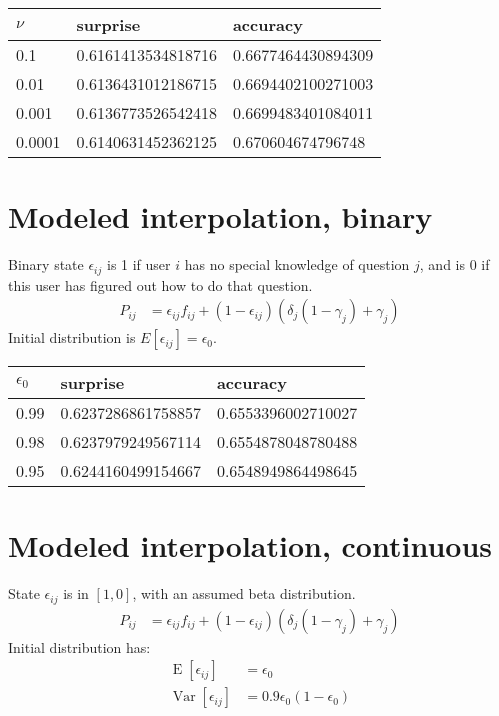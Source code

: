\documentclass{article}
\begin{document}
\begin{center}
  \begin{tabular}{lll}
    $\nu$ & surprise & accuracy \\
    \hline
    0.1 & 0.6161413534818716 & 0.6677464430894309 \\
    0.01 & 0.6136431012186715 & 0.6694402100271003 \\
    0.001 & 0.6136773526542418 & 0.6699483401084011 \\
    0.0001 & 0.6140631452362125 & 0.670604674796748
  \end{tabular}
\end{center}

\newpage
\section{Modeled interpolation, binary}

Binary state $\epsilon_{ij}$ is 1 if user $i$ has no special knowledge
of question $j$, and is 0 if this user has figured out how to do that
question.
\begin{align*}
  P_{ij} &= \epsilon_{ij} f_{ij} + (1 - \epsilon_{ij}) (\delta_j (1 - \gamma_j) + \gamma_j)
\end{align*}
Initial distribution is $E[\epsilon_{ij}] = \epsilon_0$.

\begin{center}
  \begin{tabular}{lll}
    $\epsilon_0$ & surprise & accuracy \\
    \hline
    0.99 & 0.6237286861758857 & 0.6553396002710027 \\
    0.98 & 0.6237979249567114 & 0.6554878048780488 \\
    0.95 & 0.6244160499154667 & 0.6548949864498645
  \end{tabular}
\end{center}

\section{Modeled interpolation, continuous}

State $\epsilon_{ij}$ is in $[1,0]$, with an assumed beta
distribution.
\begin{align*}
  P_{ij} &= \epsilon_{ij} f_{ij} + (1 - \epsilon_{ij}) (\delta_j (1 - \gamma_j) + \gamma_j)
\end{align*}
Initial distribution has:
\begin{align*}
  \operatorname{E}[\epsilon_{ij}] &= \epsilon_0 \\
  \operatorname{Var}[\epsilon_{ij}] &= 0.9 \epsilon_0 (1 - \epsilon_0)
\end{align*}
\end{document}
